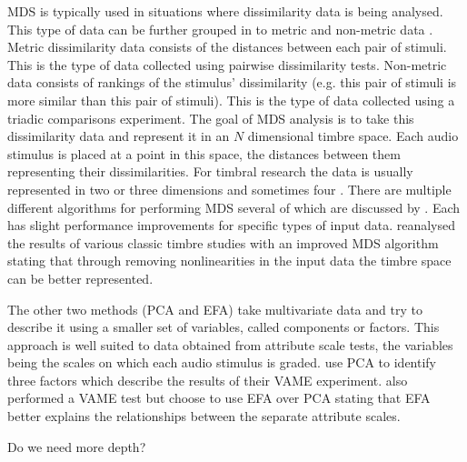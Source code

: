 		MDS is typically used in situations where dissimilarity data is being analysed. This type of data can be
		further grouped in to metric and non-metric data \citep{hair2013multivariate}. Metric dissimilarity data
		consists of the distances between each pair of stimuli. This is the type of data collected using pairwise
		dissimilarity tests. Non-metric data consists of rankings of the stimulus' dissimilarity (e.g. this pair of
		stimuli is more similar than this pair of stimuli). This is the type of data collected using a triadic
		comparisons experiment. The goal of MDS analysis is to take this dissimilarity data and represent it in an
		$N$ dimensional timbre space. Each audio stimulus is placed at a point in this space, the distances between
		them representing their dissimilarities. For timbral research the data is usually represented in two
		\citep{giragama2003relating} or three \citep{grey1978perceptual} dimensions and sometimes four
		\citep{bernays2011verbal}. There are multiple different algorithms for performing MDS several of which are
		discussed by \citet{mcadams1999perspectives}. Each has slight performance improvements for specific types
		of input data.  \citet{burgoyne2008a} reanalysed the results of various classic timbre studies with an
		improved MDS algorithm stating that through removing nonlinearities in the input data the timbre space can
		be better represented.

		The other two methods (PCA and EFA) take multivariate data and try to describe it using a smaller set of
		variables, called components or factors. This approach is well suited to data obtained from attribute scale
		tests, the variables being the scales on which each audio stimulus is graded. \citet{kendall1993verbal1}
		use PCA to identify three factors which describe the results of their VAME experiment.
		\citet{zacharakis2012analysis} also performed a VAME test but choose to use EFA over PCA stating that EFA
		better explains the relationships between the separate attribute scales.

		\note
		{
			Do we need more depth?
		}

